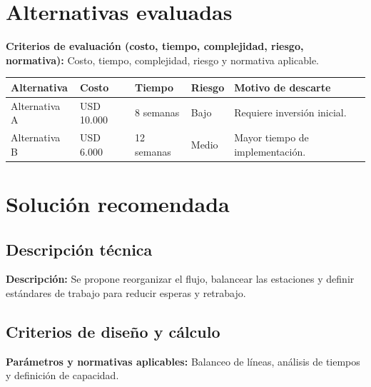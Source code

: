 \documentclass[11pt,a4paper]{article}
\newcommand{\campo}[2]{\noindent\textbf{\textcolor{irdblack}{#1:}} \textcolor{irdblack}{#2}\par\vspace{0.3em}}
\begin{document}
\section{Alternativas evaluadas}

\campo{Criterios de evaluación (costo, tiempo, complejidad, riesgo, normativa)}{Costo, tiempo, complejidad, riesgo y normativa aplicable.}

\vspace{0.5cm}

\begin{center}
\renewcommand{\arraystretch}{1.4}
\begin{tabular}{@{}p{3cm}p{2.2cm}p{2.2cm}p{2.2cm}>{\raggedright\arraybackslash}p{4.4cm}@{}}
\toprule
\textbf{\color{irdblack}Alternativa} & \textbf{\color{irdblack}Costo} & \textbf{\color{irdblack}Tiempo} & \textbf{\color{irdblack}Riesgo} & \textbf{\color{irdblack}Motivo de descarte} \\
\midrule
Alternativa A & USD 10.000 & 8 semanas & Bajo & Requiere inversión inicial. \\
\addlinespace
Alternativa B & USD 6.000 & 12 semanas & Medio & Mayor tiempo de implementación. \\
\bottomrule
\end{tabular}
\end{center}

\section{Solución recomendada}

\subsection{Descripción técnica}
\campo{Descripción}{Se propone reorganizar el flujo, balancear las estaciones y definir estándares de trabajo para reducir esperas y retrabajo.}

\subsection{Criterios de diseño y cálculo}
\campo{Parámetros y normativas aplicables}{Balanceo de líneas, análisis de tiempos y definición de capacidad.}
\end{document}

